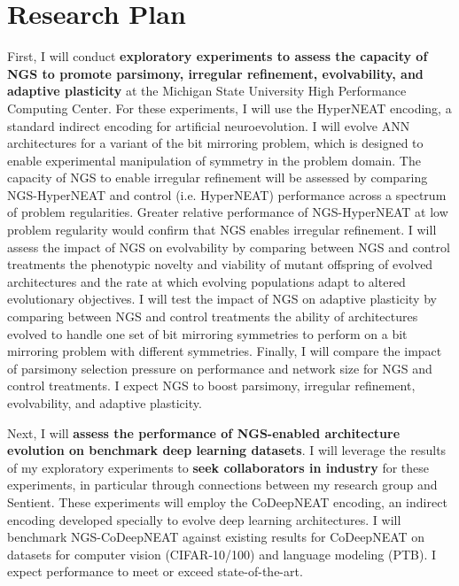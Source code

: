 \section{Research Plan}

First, I will conduct \textbf{exploratory experiments to assess the capacity of NGS to promote parsimony, irregular refinement, evolvability, and adaptive plasticity} at the Michigan State University High Performance Computing Center.
For these experiments, I will use the HyperNEAT encoding,\autocite{clune2011performance} a standard indirect encoding for artificial neuroevolution.
I will evolve ANN architectures for a variant of the bit mirroring problem, which is designed to enable experimental manipulation of symmetry in the problem domain.
The capacity of NGS to enable irregular refinement will be assessed by comparing NGS-HyperNEAT and control (i.e. HyperNEAT) performance across a spectrum of problem regularities.
Greater relative performance of NGS-HyperNEAT at low problem regularity would confirm that NGS enables irregular refinement.
I will assess the impact of NGS on evolvability by comparing between NGS and control treatments the phenotypic novelty and viability of mutant offspring of evolved architectures and the rate at which evolving populations adapt to altered evolutionary objectives.\autocite{tarapore2015evolvability}
I will test the impact of NGS on adaptive plasticity by comparing between NGS and control treatments the ability of architectures evolved to handle one set of bit mirroring symmetries to perform on a bit mirroring problem with different symmetries.
Finally, I will compare the impact of parsimony selection pressure on performance and network size for NGS and control treatments.
I expect NGS to boost parsimony, irregular refinement, evolvability, and adaptive plasticity.

Next, I will \textbf{assess the performance of NGS-enabled architecture evolution on benchmark deep learning datasets}.
I will leverage the results of my exploratory experiments to \textbf{seek collaborators in industry} for these experiments, in particular through connections between my research group and Sentient.
These experiments will employ the CoDeepNEAT encoding,\autocite{miikkulainen2017evolving} an indirect encoding developed specially to evolve deep learning architectures.
I will benchmark NGS-CoDeepNEAT against existing results for CoDeepNEAT on datasets for computer vision (CIFAR-10/100) and language modeling (PTB).
I expect performance to meet or exceed state-of-the-art.
